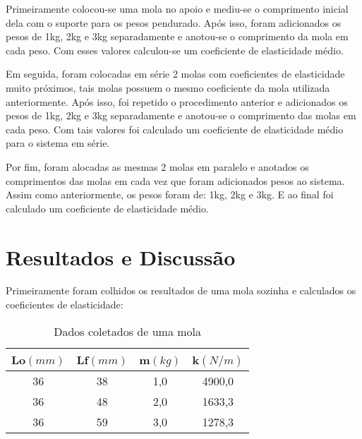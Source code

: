 \documentclass[
	12pt,				%
	oneside,			%
	a4paper,			%
	english,			%
	french,				%
	spanish,			%
	brazil,				%
	]{abntex2}
\begin{document}
Primeiramente colocou-se uma mola no apoio e mediu-se o comprimento inicial dela com o suporte para os pesos pendurado. Após isso, foram adicionados os pesos de 1kg, 2kg e 3kg separadamente e anotou-se o comprimento da mola em cada peso. Com esses valores calculou-se um coeficiente de elasticidade médio.

Em seguida, foram colocadas em série 2 molas com coeficientes de elasticidade muito próximos, tais molas possuem o mesmo coeficiente da mola utilizada anteriormente. Após isso, foi repetido o procedimento anterior e adicionados os pesos de 1kg, 2kg e 3kg separadamente e anotou-se o comprimento das molas em cada peso. Com tais valores foi calculado um coeficiente de elasticidade médio para o sistema em série.

Por fim, foram alocadas as mesmas 2 molas em paralelo e anotados os comprimentos das molas em cada vez que foram adicionados pesos ao sistema. Assim como anteriormente, os pesos foram de: 1kg, 2kg e 3kg. E ao final foi calculado um coeficiente de elasticidade médio.


\newpage
\section[Resultados e Discussão]{Resultados e Discussão}
\pagestyle{fancy}

Primeiramente foram colhidos os resultados de uma mola sozinha e calculados os coeficientes de elasticidade:

\begin{center}
\begin{table}[H]
\caption{Dados coletados de uma mola}
\begin{center}
\begin{tabular}{c|c|c|c}

\hline
Lo$(mm)$ & Lf$(mm)$ & m$(kg)$ & k$(N/m)$ \\ 
\hline
36 & 38 & 1,0 & 4900,0 \\
\hline
36 & 48 & 2,0 & 1633,3 \\
\hline
36 & 59 & 3,0 & 1278,3 \\


\end{tabular}
\end{center}
\end{table}
\end{center}
\end{document}
